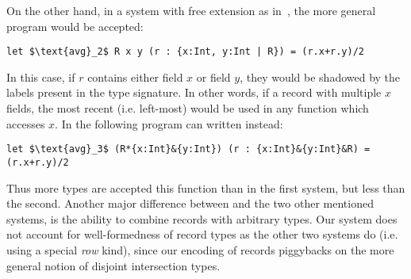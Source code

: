 On the other hand, in a system with free extension as in~\cite{leijen2005extensible}, 
the more general program would be accepted:
\begin{lstlisting}[mathescape=true]
let $\text{avg}_2$ R x y (r : {x:Int, y:Int | R}) = (r.x+r.y)/2 
\end{lstlisting}
In this case, if $r$ contains either field $x$ or field $y$, they would be shadowed by the labels 
present in the type signature.
In other words, if a record with multiple $x$ fields, the most recent (i.e. left-most) would be used 
in any function which accesses $x$.
In \name the following program can written instead:
\begin{lstlisting}[mathescape=true]
let $\text{avg}_3$ (R*{x:Int}&{y:Int}) (r : {x:Int}&{y:Int}&R) = (r.x+r.y)/2 
\end{lstlisting}
Thus more types are accepted this function than in the first system, but less than the second. 
Another major difference between \name and the two other mentioned systems, is the ability to 
combine records with arbitrary types.
Our system does not account for well-formedness of record types as the other two systems do 
(i.e. using a special \emph{row} kind), since our encoding of records piggybacks on the more
general notion of disjoint intersection types. 

